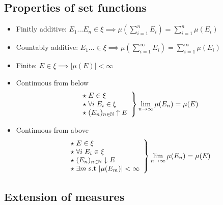 \subsection{Properties of set functions}
\begin{itemize}

\item Finitly additive: 
 $E_1 \dots E_n \in \xi \implies \mu(\sum_{i=1}^n E_i) = \sum_{i=1}^n \mu(E_i)$
 
\item Countably additive: 
 $E_1 \dots \in \xi \implies \mu(\sum_{i=1}^{\infty} E_i) = \sum_{i=1}^{\infty} \mu(E_i) $

\item Finite: 
 $E \in \xi \implies \left |\mu(E) \right| < \infty $

 \item Continuous from below
\[ \left.
\begin{array}{l l}
\star \; E \in \xi \\
\star \; \forall i \; E_i \in \xi \\
\star \; (E_n)_{n \in \mathbb{N}} \uparrow E \\
\end{array}
\right\} \lim_{n \to\infty}\mu(E_n) = \mu(E) \]

\item Continuous from above
\[ \left.
\begin{array}{l l}
\star \; E \in \xi \\
\star \; \forall i \; E_i \in \xi \\
\star \; (E_n)_{n \in \mathbb{N}} \downarrow E \\
\star \; \exists m$ s.t $|\mu(E_m)| < \infty 
\end{array}
\right\} \lim_{n \to\infty}\mu(E_n) = \mu(E) \]

\end{itemize}

\subsection{Extension of measures}

